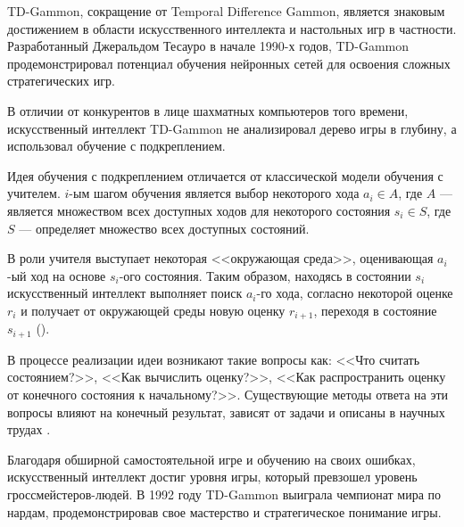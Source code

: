 TD-Gammon, сокращение от Temporal Difference Gammon, является знаковым достижением в области искусственного интеллекта и настольных игр в частности. Разработанный Джеральдом Тесауро в начале 1990-х годов, TD-Gammon продемонстрировал потенциал обучения нейронных сетей для освоения сложных стратегических игр.

В отличии от конкурентов в лице шахматных компьютеров того времени, искусственный интеллект TD-Gammon не анализировал дерево игры в глубину, а использовал обучение с подкреплением.

Идея обучения с подкреплением отличается от классической модели обучения с учителем. $i$-ым шагом обучения является выбор некоторого хода $a_i \in A$, где $A$ --- является множеством всех доступных ходов для некоторого состояния $s_i \in S$, где $S$ --- определяет множество всех доступных состояний.

В роли учителя выступает некоторая <<окружающая среда>>, оценивающая $a_i$-ый ход на основе $s_i$-ого состояния. Таким образом, находясь в состоянии $s_i$ искусственный интеллект выполняет поиск $a_i$-го хода, согласно некоторой оценке $r_i$ и получает от окружающей среды новую оценку $r_{i + 1}$, переходя в состояние $s_{i + 1}$ ().


В процессе реализации идеи возникают такие вопросы как: <<Что считать состоянием?>>, <<Как вычислить оценку?>>, <<Как распространить оценку от конечного состояния к начальному?>>. Существующие методы ответа на эти вопросы влияют на конечный результат, зависят от задачи и описаны в научных трудах \cite{tdlearn}.

Благодаря обширной самостоятельной игре и обучению на своих ошибках, искусственный интеллект достиг уровня игры, который превзошел уровень гроссмейстеров-людей. В 1992 году TD-Gammon выиграла чемпионат мира по нардам, продемонстрировав свое мастерство и стратегическое понимание игры.

